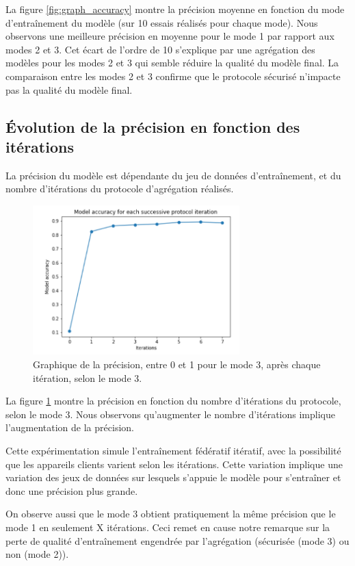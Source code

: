 \documentclass{article}
\begin{document}
La figure \ref{fig:graph_accuracy} montre la précision moyenne en fonction du mode d'entraînement du modèle (sur 10 essais réalisés pour chaque mode). Nous observons une meilleure précision en moyenne pour le mode 1 par rapport aux modes 2 et 3. Cet écart de l'ordre de 10\text{\%} s'explique par une agrégation des modèles pour les modes 2 et 3 qui semble réduire la qualité du modèle final. La comparaison entre les modes 2 et 3 confirme que le protocole sécurisé n'impacte pas la qualité du modèle final.

\subsection{Évolution de la précision en fonction des itérations}
La précision du modèle est dépendante du jeu de données d'entraînement, et du nombre d'itérations du protocole d’agrégation réalisés.

    \begin{figure}[H]
    \centerline{\includegraphics[width=8cm]{img/graph_accuracy_per_iterations.png}}
  \caption{Graphique de la précision, entre 0 et 1 pour le mode 3, après chaque itération, selon le mode 3.}
  \label{fig:graph_iteration}
\end{figure}

La figure \ref{fig:graph_iteration} montre la précision en fonction du nombre d'itérations du protocole, selon le mode 3. Nous observons qu'augmenter le nombre d'itérations implique l'augmentation de la précision.

Cette expérimentation simule l'entraînement fédératif itératif, avec la possibilité que les appareils clients varient selon les itérations. Cette variation implique une variation des jeux de données sur lesquels s'appuie le modèle pour s'entraîner et donc une précision plus grande.

On observe aussi que le mode 3 obtient pratiquement la même précision que le mode 1 en seulement X itérations. Ceci remet en cause notre remarque sur la perte de qualité d'entraînement engendrée par l’agrégation (sécurisée (mode 3) ou non (mode 2)).
\end{document}
